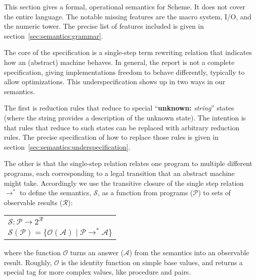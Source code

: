 

This section gives a formal, operational semantics for Scheme. It does not cover the entire language. The notable missing features are the macro system, I/O, and the numeric tower. The precise list of features included is given in section~\ref{sec:semantics:grammar}.

The core of the specification is a single-step term rewriting relation that indicates how an (abstract) machine behaves. In general, the report is not a complete specification, giving implementations freedom to behave differently, typically to allow optimizations. This underspecification shows up in two ways in our semantics. 

The first is reduction rules that reduce to special ``\textbf{unknown:} \textit{string}'' states (where the string provides a description of the unknown state). The intention is that rules that reduce to such states can be replaced with arbitrary reduction rules. The precise specification of how to replace those rules is given in section~\ref{sec:semantics:underspecification}.

The other is that the single-step relation relates one program to
multiple different programs, each corresponding to a legal transition
that an abstract machine might take. Accordingly we use the transitive
closure of the single step relation $\rightarrow^*$ to define the
semantics, $\mathcal{S}$, as a function from programs ($\mathcal{P}$)
to sets of observable results ($\mathcal{R}$):
\begin{center}
\begin{tabular}{l}
$\mathcal{S} : \mathcal{P} \longrightarrow 2^{\mathcal{R}}$ \\
$\mathcal{S}(\mathcal{P}) = \{ \mathscr{O}(\mathcal{A}) \mid \mathcal{P} \rightarrow^* \mathcal{A} \}$
\end{tabular}
\end{center}
where the function $\mathscr{O}$ turns an answer ($\mathcal{A}$) from the semantics into an observable result. Roughly, $\mathscr{O}$ is the identity function on simple base values, and returns a special tag for more complex values, like procedure and pairs.

